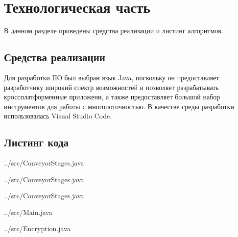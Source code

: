 \chapter{Технологическая часть}

В данном разделе приведены средства реализации и листинг алгоритмов.

\section{Средства реализации}

Для разработки ПО был выбран язык Java, поскольку он предоставляет разработчику широкий спектр возможностей и позволяет разрабатывать кроссплатформенные приложени, а также предоставляет большой набор инструментов для работы с многопоточностью. В качестве среды разработки использовалась Visual Studio Code. \cite{code}

\section{Листинг кода}


\begin{lstinputlisting}[
	caption={Реализация первого уровня конвейера},
	label={lst:first},
	style={javalang},
	linerange={2-25}
]{../src/ConveyorStages.java}
\end{lstinputlisting}



\begin{lstinputlisting}[
	caption={Реализация второго уровня конвейера},
	label={lst:second},
	style={javalang},
	linerange={26-49}
]{../src/ConveyorStages.java}
\end{lstinputlisting}

\begin{lstinputlisting}[
	caption={Реализация третьего уровня конвейера},
	label={lst:third},
	style={javalang},
	linerange={51-75}
]{../src/ConveyorStages.java}
\end{lstinputlisting}

\begin{lstinputlisting}[
	caption={Реализация главного рабочего процесса},
	label={lst:main},
	style={javalang},
	linerange={51-92}
]{../src/Main.java}
\end{lstinputlisting}


\begin{lstinputlisting}[
	caption={Реализация алгоритма кодирования строки},
	label={lst:log},
	style={javalang},
	linerange={2-41}
]{../src/Encryption.java}
\end{lstinputlisting}





